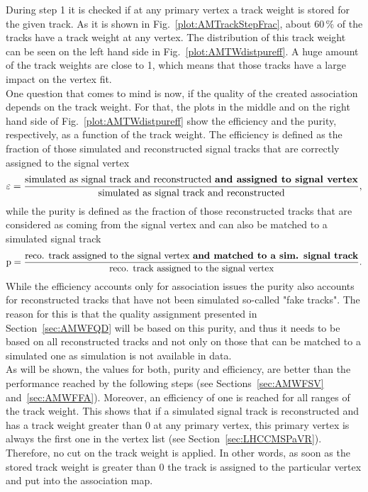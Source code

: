 During step 1 it is checked if at any primary vertex a track weight is stored for the given track.  As it is shown in Fig.~\ref{plot:AMTrackStepFrac}, about $60\,\%$ of the tracks have a track weight at any vertex. The distribution of this track weight can be seen on the left hand side in Fig.~\ref{plot:AMTWdistpureff}. A huge amount of the track weights are close to 1, which means that those tracks have a large impact on the vertex fit.\\
One question that comes to mind is now, if the quality of the created association depends on the track weight. For that, the plots in the middle and on the right hand side of Fig.~\ref{plot:AMTWdistpureff} show the efficiency and the purity, respectively, as a function of the track weight. The efficiency is defined as the fraction of those simulated and reconstructed signal tracks that are correctly assigned to the signal vertex
\begin{equation}
    \varepsilon = \frac{\textrm{simulated as signal track and reconstructed \textbf{and assigned to signal vertex}}}{\textrm{simulated as signal track and reconstructed}},
    \label{eq:Efficiency}
\end{equation}
while the purity is defined as the fraction of those reconstructed tracks that are considered as coming from the signal vertex and can also be matched to a simulated signal track
\begin{equation}
    \textrm{p} = \frac{\textrm{reco. track assigned to the signal vertex \textbf{and matched to a sim. signal track}}}{\textrm{reco. track assigned to the signal vertex}}.
    \label{eq:Purity}
\end{equation}
While the efficiency accounts only for association issues the purity also accounts for reconstructed tracks that have not been simulated so-called "fake tracks". The reason for this is that the quality assignment presented in Section~\ref{sec:AMWFQD} will be based on this purity, and thus it needs to be based on all reconstructed tracks and not only on those that can be matched to a simulated one as simulation is not available in data. \\
As will be shown, the values for both, purity and efficiency, are better than the performance reached by the following steps (see Sections~\ref{sec:AMWFSV} and~\ref{sec:AMWFFA}). Moreover, an efficiency of one is reached for all ranges of the track weight. This shows that if a simulated signal track is reconstructed and has a track weight greater than 0 at any primary vertex, this primary vertex is always the first one in the vertex list (see Section~\ref{sec:LHCCMSPaVR}). Therefore, no cut on the track weight is applied. In other words, as soon as the stored track weight is greater than 0 the track is assigned to the particular vertex and put into the association map.

